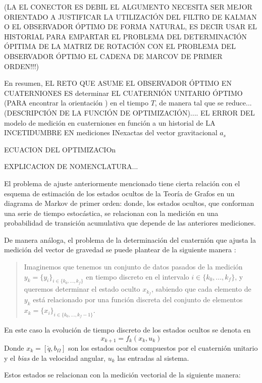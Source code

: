 \documentclass[conference]{IEEEtran}
\begin{document}
(LA EL CONECTOR ES DEBIL EL ALGUMENTO NECESITA SER MEJOR ORIENTADO
A JUSTIFICAR LA UTILIZACIÓN DEL FILTRO DE KALMAN O EL OBSERVADOR ÓPTIMO DE FORMA NATURAL, ES DECIR USAR EL HISTORIAL PARA EMPARTAR EL PROBLEMA DEL DETERMINACIÓN ÓPITIMA DE LA MATRIZ DE ROTACIÓN CON EL PROBLEMA DEL OBSERVADOR ÓPTIMO EL CADENA DE MARCOV DE PRIMER ORDEN!!!)\par
En resumen, EL RETO QUE ASUME EL OBSERVADOR ÓPTIMO EN CUATERNIONES ES determinar EL CUATERNIÓN UNITARIO ÓPTIMO (PARA encontrar la orientación \cite{Sola2012}) en el tiempo $T$, de manera tal que se reduce...\\
(DESCRIPCIÓN DE LA FUNCIÓN DE OPTIMIZACIÓN).... EL ERROR DEL modelo de medición en cuaterniones en función a un historial de LA INCETIDUMBRE EN mediciones INexactas del vector gravitacional $a_s$ \par
ECUACION DEL OPTIMIZACIOn\par
EXPLICACION DE NOMENCLATURA...\par
El problema de ajuste anteriormente mencionado tiene cierta relación con el esquema de estimación de los estados ocultos de la Teoría de Grafos en un diagrama de Markov de primer orden: donde, los estados ocultos, que conforman una serie de tiempo estocástica, se relacionan con la medición en una probabilidad de transición acumulativa que depende de las anteriores mediciones.\par
De manera análoga, el problema de la determinación del cuaternión que ajusta la medición del vector de gravedad se puede plantear de la siguiente manera \cite{Merwe2004}: 
\begin{quote} Imaginemos que tenemos un conjunto de datos pasados de la medición $y_k=\{y_i\}_{i\in\{k_0,...,k_f\}}$ en tiempo discreto en el intervalo $i\in\{k_0,...,k_f\}$, y queremos determinar el estado oculto $x_{k_f}$, sabiendo que cada elemento de $y_k$ está relacionado por una función discreta del conjunto de elementos $x_k=\{x_i\}_{i\in\{k_0,...,k_f-1\}}$.\end{quote}
En este caso la evolución de tiempo discreto de los estados ocultos se denota en
\begin{equation}
\label{chap2:ecc1}
x_{k+1}=f_k(x_k,u_k)
\end{equation} 
Donde $x_k=[\breve{q},b_\Omega]$ son los estados ocultos compuestos por el cuaternión unitario y el \emph{bias} de la velocidad angular, $u_k$ las entradas al sistema. \par Estos estados se relacionan con la medición vectorial de la siguiente manera:
\end{document}
